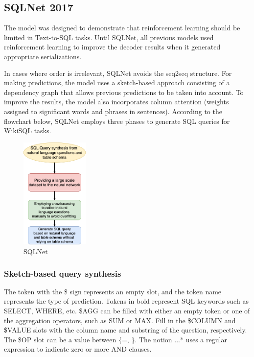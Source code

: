 \subsection{SQLNet 2017}

The model was designed to demonstrate that reinforcement learning should be limited in Text-to-SQL tasks.
Until SQLNet\cite{xu_sqlnet_2017}, all previous models used reinforcement learning to improve the decoder results when it generated appropriate serializations.


In cases where order is irrelevant, SQLNet avoids the seq2seq structure.
For making predictions, the model uses a sketch-based approach consisting of a dependency graph that allows previous predictions to be taken into account.
To improve the results, the model also incorporates column attention (weights assigned to significant words and phrases in sentences). According to the flowchart below, SQLNet employs three phases to generate SQL queries for WikiSQL tasks.

\begin{figure}[htb]
    \centering
    \includegraphics[width=0.3\textwidth]{pics/sqlnet/sqlnet.png}
    \caption{SQLNet}
    \label{fig:sqlnet}
\end{figure}

\subsubsection{Sketch-based query synthesis}

The token with the \$ sign represents an empty slot, and the token name represents the type of prediction. Tokens in bold represent SQL keywords such as SELECT, WHERE, etc.
\$AGG can be filled with either an empty token or one of the aggregation operators, such as SUM or MAX. Fill in the \$COLUMN and \$VALUE slots with the column name and substring of the question, respectively. The \$OP slot can be a value between \{=, \}. The notion \(...\)* uses a regular expression to indicate zero or more AND clauses.


